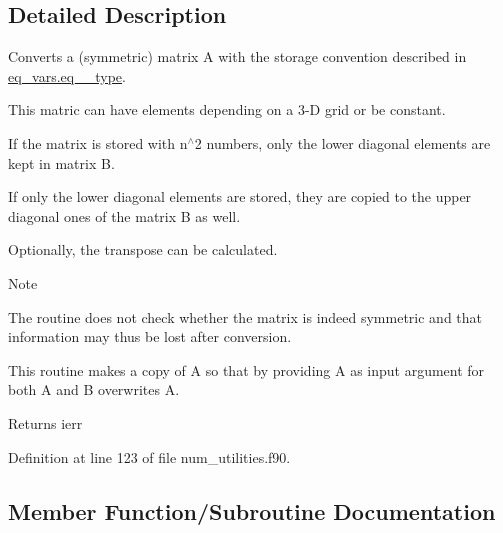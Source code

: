 \subsection{Detailed Description}
Converts a (symmetric) matrix A with the storage convention described in \hyperlink{structeq__vars_1_1eq__2__type}{eq\+\_\+vars.\+eq\+\_\+\_\+type}. 

This matric can have elements depending on a 3-\/D grid or be constant.


\begin{DoxyItemize}
\item If the matrix is stored with n$^\wedge$2 numbers, only the lower diagonal elements are kept in matrix B.
\item If only the lower diagonal elements are stored, they are copied to the upper diagonal ones of the matrix B as well.
\end{DoxyItemize}

Optionally, the transpose can be calculated.

\begin{DoxyNote}{Note}

\begin{DoxyEnumerate}
\item The routine does not check whether the matrix is indeed symmetric and that information may thus be lost after conversion.
\item This routine makes a copy of A so that by providing A as input argument for both A and B overwrites A.
\end{DoxyEnumerate}
\end{DoxyNote}
\begin{DoxyReturn}{Returns}
ierr 
\end{DoxyReturn}


Definition at line 123 of file num\+\_\+utilities.\+f90.



\subsection{Member Function/\+Subroutine Documentation}
\mbox{\label{interfacenum__utilities_1_1conv__mat_a1f24e4892c2253309edbdc6705869d47}} 

